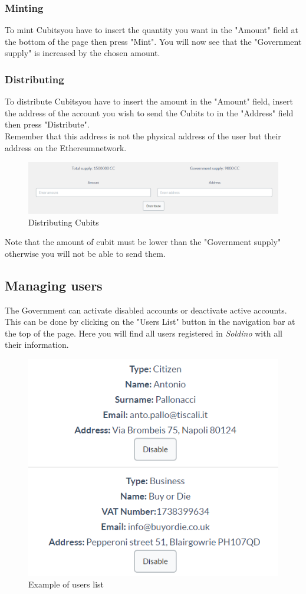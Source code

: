 		\subsubsection{Minting}
		To mint Cubits\glosp you have to insert the quantity you want in the 
		"Amount" field at the bottom of the page then press "Mint". You will 
		now see that the "Government supply" is increased by the chosen amount.
		\subsubsection{Distributing}
		To distribute Cubits\glosp you have to insert the amount in the "Amount" 
		field, insert the address of the account you wish to send the Cubits to 
		in the "Address" field then press "Distribute".\\
		Remember that this address is not the physical address of the user but 
		their address on the Ethereum\glosp network.
		\begin{figure}[H]
			\includegraphics[width=15cm]{res/images/distribute_cubit.png}
			\centering
			\caption{Distributing Cubits}
		\end{figure}
		Note that the amount of cubit must be lower than the "Government  
		supply" otherwise you will not be able to send them.
	\subsection{Managing users}
	The Government can activate disabled accounts or deactivate active accounts.
	This can be done by clicking on the "Users List" button in the navigation
	bar at the top of the page. Here you will find all users registered in 
	\textit{Soldino} with all their information.
	\begin{figure}[H]
		\includegraphics[width=13cm]{res/images/users_list.png}
		\centering
		\caption{Example of users list}
	\end{figure}

